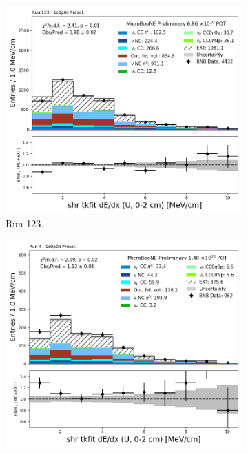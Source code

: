 \begin{figure}[H]
    \centering
    \begin{subfigure}[t]{0.32\linewidth}
        \includegraphics[width=\linewidth]{technote/Appendix_Preselection/Figures/1e0p0pi/Run123/shr_tkfit_2cm_dedx_U_Run123_1e0p0pi_Presel.png}
        \caption{Run 123.}
    \end{subfigure}%
    \hspace{0.2cm}%
    \begin{subfigure}[t]{0.32\linewidth}
        \includegraphics[width=\linewidth]{technote/Appendix_Preselection/Figures/1e0p0pi/Run4b/shr_tkfit_2cm_dedx_U_Run4b_1e0p0pi_Presel.png}

\end{subfigure}
\end{figure}

